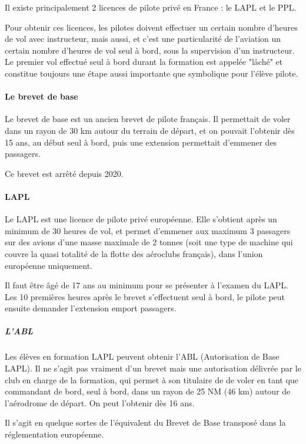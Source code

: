 	Il existe principalement 2 licences de pilote privé en France : le LAPL et le PPL.
	
	Pour obtenir ces licences, les pilotes doivent effectuer un certain nombre d'heures de vol avec instructeur, mais aussi, et c'est une particularité de l'aviation un certain nombre d'heures de vol seul à bord, sous la supervision d'un instructeur. Le premier vol effectué seul à bord durant la formation est appelée "lâché" et constitue toujours une étape aussi importante que symbolique pour l'élève pilote.
	
	\paragraph{Le brevet de base}
	Le brevet de base est un ancien brevet de pilote français. Il permettait de voler dans un rayon de 30 km autour du terrain de départ, et on pouvait l'obtenir dès 15 ans, au début seul à bord, puis une extension permettait d'emmener des passagers.
	
	Ce brevet est arrêté depuis 2020.
	
	\paragraph{LAPL}
	Le LAPL  est une licence de pilote privé européenne. Elle s'obtient après un minimum de 30 heures de vol, et permet d'emmener aux maximum 3 passagers sur des avions d'une masse maximale de 2 tonnes (soit une type de machine qui couvre la quasi totalité de la flotte des aéroclubs français), dans l'union européenne uniquement.
	
	Il faut être âgé de 17 ans au minimum pour se présenter à l'examen du LAPL. Les 10 premières heures après le brevet s'effectuent seul à bord, le pilote peut ensuite demander l'extension emport passagers.
	
	\subparagraph{L'ABL}
	Les élèves en formation LAPL peuvent obtenir l'ABL (Autorisation de Base LAPL). Il ne s'agit pas vraiment d'un brevet mais une autorisation délivrée par le club en charge de la formation, qui permet à son titulaire de de voler en tant que commandant de bord, seul à bord, dans un rayon de 25 NM (46 km) autour de l'aérodrome de départ. On peut l'obtenir dès 16 ans.
	
	Il s'agit en quelque sortes de l'équivalent du Brevet de Base transposé dans la réglementation européenne.
	
	
